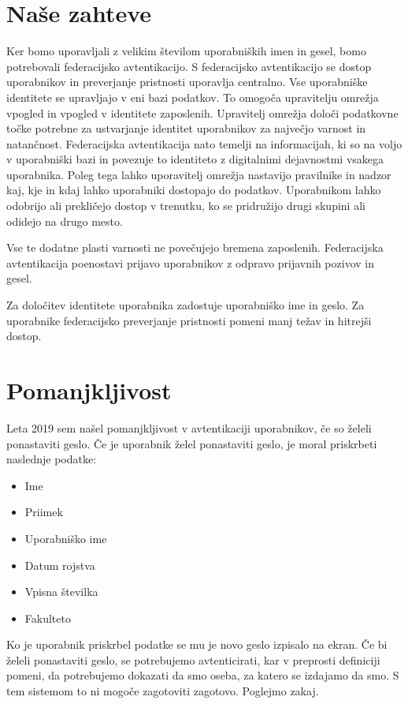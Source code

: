 \documentclass[a4paper,12pt,openright]{book}
\begin{document}
\section{Naše zahteve}

Ker bomo uporavljali z velikim številom uporabniških imen in gesel, bomo potrebovali federacijsko avtentikacijo. S federacijsko avtentikacijo se dostop uporabnikov in preverjanje pristnosti uporavlja centralno. Vse uporabniške identitete se upravljajo v eni bazi podatkov. To omogoča upravitelju omrežja vpogled in vpogled v identitete zaposlenih. Upravitelj omrežja določi podatkovne točke potrebne za ustvarjanje identitet uporabnikov za največjo varnost in natančnost. Federacijska avtentikacija nato temelji na informacijah, ki so na voljo v uporabniški bazi in povezuje to identiteto z digitalnimi dejavnostmi vsakega uporabnika. Poleg tega lahko uporavitelj omrežja nastavijo pravilnike in nadzor kaj, kje in kdaj lahko uporabniki dostopajo do podatkov. Uporabnikom lahko odobrijo ali prekličejo dostop v trenutku, ko se pridružijo drugi skupini ali odidejo na drugo mesto.
\newline

Vse te dodatne plasti varnosti ne povečujejo bremena zaposlenih. Federacijska avtentikacija poenostavi prijavo uporabnikov z odpravo prijavnih pozivov in gesel.

Za določitev identitete uporabnika zadostuje uporabniško ime in geslo. Za uporabnike federacijsko preverjanje pristnosti pomeni manj težav in hitrejši dostop.

\section{Pomanjkljivost}
Leta 2019 sem našel pomanjkljivost v avtentikaciji uporabnikov, če so želeli ponastaviti geslo. Če je uporabnik želel ponastaviti geslo, je moral priskrbeti naslednje podatke:
\begin{itemize}
    \item Ime
    \item Priimek
    \item Uporabniško ime
    \item Datum rojstva
    \item Vpisna številka
    \item Fakulteto
\end{itemize}

Ko je uporabnik priskrbel podatke se mu je novo geslo izpisalo na ekran. Če bi želeli ponastaviti geslo, se potrebujemo avtenticirati, kar v preprosti definiciji pomeni, da potrebujemo dokazati da smo oseba, za katero se izdajamo da smo. S tem sistemom to ni mogoče zagotoviti zagotovo. Poglejmo zakaj.
\end{document}
